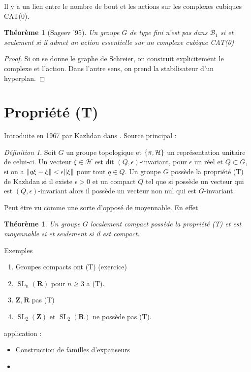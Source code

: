 \documentclass[a4paper]{article}
\newtheorem{thm}[lem]{Théorème}
\theoremstyle{remark}%
\newtheorem{defn}[lem]{Définition}
\DeclareMathOperator\SL{SL}
\DeclarePairedDelimiter\set{\lbrace}{\rbrace}
\DeclarePairedDelimiter\norm{\|}{\|}
\renewcommand*{\H}{\mathcal{H}}
\newcommand*{\field}[1]{\mathbf{#1}}
\newcommand*{\Z}{\field{Z}}
\newcommand*{\R}{\field{R}}
\newcommand*{\B}{\mathcal{B}_1}
\renewcommand*{\H}{\mathcal{H}}
\begin{document}
Il y a un lien entre le nombre de bout et les actions sur les complexes cubiques CAT(0).
%
\begin{thm}[Sageev '95]
Un groupe $G$ de type fini n'est pas dans $\B$ si et seulement si il admet un action essentielle sur un complexe cubique CAT(0)
\end{thm}
%
\begin{proof}
Si on se donne le graphe de Schreier, on construit explicitement le complexe et l'action. Dans l'autre sens, on prend la stabilisateur d'un hyperplan. 
\end{proof}
%
%
\section{Propriété (T)}
Introduite en 1967 par Kazhdan dans \cite{Kazhdan1967}. Source principal : \cite{Bekka2008}
\begin{defn}
Soit $G$ un groupe topologique et $\set*{\pi, \H}$ un représentation unitaire de celui-ci. Un vecteur $\xi \in \H$ est dit $(Q,\epsilon)$-invariant, pour $\epsilon$ un réel et $Q \subset G$, si on a $\norm{q \xi - \xi} < \epsilon \norm{\xi}$ pour tout $q \in Q$. Un groupe $G$ possède la propriété (T) de Kazhdan si il existe $\epsilon>0$ et un compact $Q$ tel que si possède un vecteur qui est $(Q,\epsilon)$-invariant alors il possède un vecteur non nul qui est $G$-invariant.
\end{defn}
%
Peut être vu comme une sorte d'opposé de moyennable. En effet
\begin{thm}
Un groupe $G$ localement compact possède la propriété (T) et est moyennable si et seulement si il est compact. 
\end{thm}
%
%
Exemples
\begin{enumerate}
\item Groupes compacts ont (T) (exercice) 
\item $\SL_n(\R)$ pour $n \geq 3$ a (T).
\item $\Z,\R$ pas (T)
\item $\SL_2(\Z)$ et $\SL_2(\R)$ ne possède pas (T).
\end{enumerate}
%
application : 
\begin{itemize}
\item  Construction de familles d'expanseurs
\item 
\end{itemize}
%
%
\end{document}
